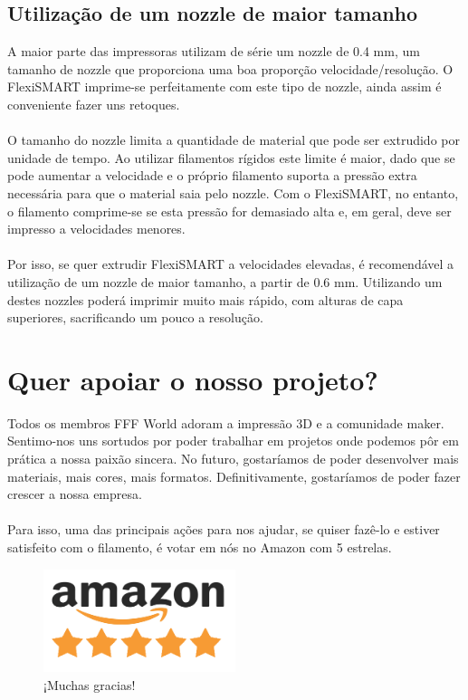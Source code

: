 \documentclass[11pt,a4paper]{article}
\begin{document}
	\subsection{Utilização de um nozzle de maior tamanho}
A maior parte das impressoras utilizam de série um nozzle de 0.4 mm, um tamanho de nozzle que proporciona uma boa proporção velocidade/resolução. O FlexiSMART imprime-se perfeitamente com este tipo de nozzle, ainda assim é conveniente fazer uns retoques.
\\\\
O tamanho do nozzle limita a quantidade de material que pode ser extrudido por unidade de tempo. Ao utilizar filamentos rígidos este limite é maior, dado que se pode aumentar a velocidade e o próprio filamento suporta a pressão extra necessária para que o material saia pelo nozzle. Com o FlexiSMART, no entanto, o filamento comprime-se se esta pressão for demasiado alta e, em geral, deve ser impresso a velocidades menores.
\\\\
Por isso, se quer extrudir FlexiSMART a velocidades elevadas, é recomendável a utilização de um nozzle de maior tamanho, a partir de 0.6 mm. Utilizando um destes nozzles poderá imprimir muito mais rápido, com alturas de capa superiores, sacrificando um pouco a resolução.
\section{Quer apoiar o nosso projeto?}
Todos os membros FFF World adoram a impressão 3D e a comunidade maker. Sentimo-nos uns sortudos por poder trabalhar em projetos onde podemos pôr em prática a nossa paixão sincera. No futuro, gostaríamos de poder desenvolver mais materiais, mais cores, mais formatos. Definitivamente, gostaríamos de poder fazer crescer a nossa empresa.
\\\\
Para isso, uma das principais ações para nos ajudar, se quiser fazê-lo e estiver satisfeito com o filamento, é votar em nós no Amazon com 5 estrelas.
\begin{figure}[H]
\centering
\includegraphics[width=0.5\textwidth,cfbox=azul_marcos 1pt 0pt]{FOTOS/AMAZON_FIVE_STARS}
\caption*{¡Muchas gracias!}
\end{figure}
\end{document}
